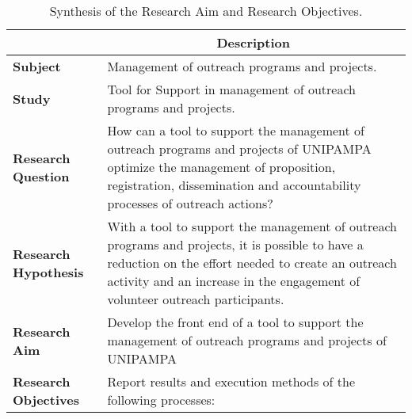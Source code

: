 \begin{table}[!htb]
  \centering
  \caption{Synthesis of the Research Aim and Research Objectives.}
  \label{tbl:intro-objectives}
  \footnotesize
  \begin{tabular}{l|p{11cm}}
    \bottomrule
    \rowcolor[rgb]{0.749,0.749,0.749} \multicolumn{1}{c|}{\textbf{Topic}}                  & \multicolumn{1}{c}{\textbf{Description}}                                                                                                                                                                                              \\
    \hline
    \rowcolor[rgb]{0.898,0.898,0.898} \textcolor[rgb]{0.145,0.145,0.145}{\textbf{Subject}} & Management of outreach programs and projects.                                                                                                                                                                                         \\
    \textbf{Study}                                                                         & Tool for Support in management of outreach programs and projects.                                                                                                                                                                     \\
    \rowcolor[rgb]{0.898,0.898,0.898} \textbf{Research Question}                           & How can a tool to support the management of outreach programs and projects of \acs{UNIPAMPA} optimize the management of proposition, registration, dissemination and accountability processes of outreach actions?                    \\
    \textcolor[rgb]{0.145,0.145,0.145}{\textbf{Research Hypothesis}}                       & With a tool to support the management of outreach programs and projects, it is possible to have a reduction on the effort needed to create an outreach activity and an increase in the engagement of volunteer outreach participants. \\
    \rowcolor[rgb]{0.898,0.898,0.898} \textbf{Research Aim}                                & Develop the front end of a tool to support the management of outreach programs and projects of \acs{UNIPAMPA}                                                                                                                         \\
    \textbf{Research Objectives}                                                           & Report results and execution methods of the following processes:

\end{tabular}
\end{table}
